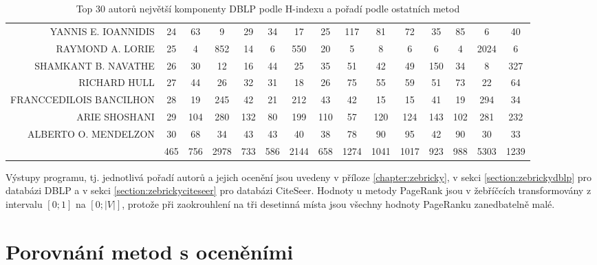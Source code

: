 \documentclass{bakalarka}
\begin{document}
\begin{table}[!ht]
\begin{center}
{\begin{scriptsize}
\begin{tabular}{r|cccccccccccccc}
YANNIS E. IOANNIDIS&24&63&9&29&34&17&25&117&81&72&35&85&6&40\\
RAYMOND A. LORIE&25&4&852&14&6&550&20&5&8&6&6&4&2024&6\\
SHAMKANT B. NAVATHE&26&30&12&16&44&25&35&51&42&49&150&34&8&327\\
RICHARD HULL&27&44&26&32&31&18&26&75&55&59&51&73&22&64\\
FRANCCEDILOIS BANCILHON&28&19&245&42&21&212&43&42&15&15&41&19&294&34\\
ARIE SHOSHANI&29&104&280&132&80&199&110&57&120&124&143&102&281&232\\
ALBERTO O. MENDELZON&30&68&34&43&43&40&38&78&90&95&42&90&30&33\\
\midrule
&465&756&2978&733&586&2144&658&1274&1041&1017&923&988&5303&1239\\
\bottomrule
\end{tabular}
\end{scriptsize}
}
\end{center}
\caption{Top 30 autorů největší komponenty DBLP podle H-indexu a pořadí podle ostatních metod}
\label{tab:ranks2}
\end{table}

Výstupy programu, tj. jednotlivá pořadí autorů a jejich ocenění jsou uvedeny v
příloze \ref{chapter:zebricky}, v sekci \ref{section:zebrickydblp} pro databázi
DBLP a v sekci \ref{section:zebrickyciteseer} pro databázi CiteSeer.  Hodnoty u
metody PageRank jsou v žebříčcích transformovány z intervalu $[0; 1]$ na $[0;
|V|]$, protože při zaokrouhlení na tři desetinná místa jsou všechny hodnoty
PageRanku zanedbatelně malé.

\section{Porovnání metod s oceněními}
\end{document}
